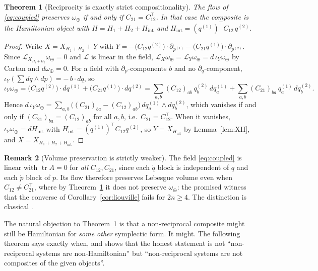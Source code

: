 \documentclass[10pt,a4paper]{article}
\theoremstyle{plain}
\newtheorem{theorem}{Theorem}
\theoremstyle{definition}
\newtheorem{remark}[theorem]{Remark}
\newcommand{\Lie}{\mathcal{L}}
\newcommand{\ins}{\iota}
\DeclareMathOperator{\tr}{tr}
\begin{document}
\begin{theorem}[Reciprocity is exactly strict compositionality]
\label{thm:reciprocity}
The flow of \eqref{eq:coupled} preserves $\omega_\oplus$ if and only if $C_{21} = C_{12}^{\!\top}$. In that case the composite is the Hamiltonian object with $H = H_1 + H_2 + H_{\mathrm{int}}$ and $H_{\mathrm{int}} = (q^{(1)})^{\!\top}C_{12}\,q^{(2)}$.
\end{theorem}
\begin{proof}
Write $X = X_{H_1+H_2} + Y$ with $Y = -\big(C_{12}q^{(2)}\big)\cdot\partial_{p^{(1)}} - \big(C_{21}q^{(1)}\big)\cdot\partial_{p^{(2)}}$. Since $\Lie_{X_{H_1+H_2}}\omega_\oplus = 0$ and $\Lie$ is linear in the field, $\Lie_X\omega_\oplus = \Lie_Y\omega_\oplus = d\,\ins_Y\omega_\oplus$ by Cartan and $d\omega_\oplus = 0$. For a field with $\partial_{p}$-components $b$ and no $\partial_q$-component, $\ins_Y(\sum dq\wedge dp) = -\,b\cdot dq$, so
\[
\ins_Y\omega_\oplus = \big(C_{12}q^{(2)}\big)\cdot dq^{(1)} + \big(C_{21}q^{(1)}\big)\cdot dq^{(2)}
= \sum_{a,b}(C_{12})_{ab}\,q^{(2)}_b\,dq^{(1)}_a + \sum_{a,b}(C_{21})_{ba}\,q^{(1)}_a\,dq^{(2)}_b .
\]
Hence $d\,\ins_Y\omega_\oplus = \sum_{a,b}\big((C_{21})_{ba} - (C_{12})_{ab}\big)\,dq^{(1)}_a\wedge dq^{(2)}_b$, which vanishes if and only if $(C_{21})_{ba} = (C_{12})_{ab}$ for all $a,b$, i.e.\ $C_{21} = C_{12}^{\top}$. When it vanishes, $\ins_Y\omega_\oplus = dH_{\mathrm{int}}$ with $H_{\mathrm{int}} = (q^{(1)})^{\top}C_{12}q^{(2)}$, so $Y = X_{H_{\mathrm{int}}}$ by Lemma~\ref{lem:XH}, and $X = X_{H_1+H_2+H_{\mathrm{int}}}$.
\end{proof}

\begin{remark}[Volume preservation is strictly weaker]
\label{rem:volumeweak}
The field \eqref{eq:coupled} is linear with $\tr A = 0$ for \emph{all} $C_{12},C_{21}$, since each $\dot q$ block is independent of $q$ and each $\dot p$ block of $p$. Its flow therefore preserves Lebesgue volume even when $C_{12}\neq C_{21}^{\top}$, where by Theorem~\ref{thm:reciprocity} it does not preserve $\omega_\oplus$: the promised witness that the converse of Corollary~\ref{cor:liouville} fails for $2n\geq 4$. The distinction is classical \cite[Ch.~8]{Arnold1989}.
\end{remark}

The natural objection to Theorem~\ref{thm:reciprocity} is that a non-reciprocal composite might still be Hamiltonian for \emph{some other} symplectic form. It might. The following theorem says exactly when, and shows that the honest statement is not ``non-reciprocal systems are non-Hamiltonian'' but ``non-reciprocal systems are not composites of the given objects''.
\end{document}
